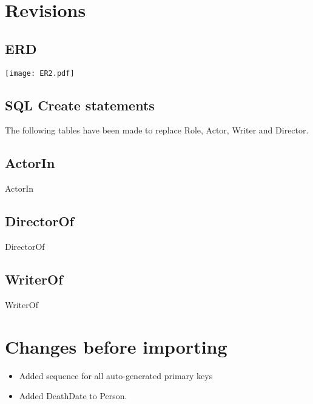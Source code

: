 \section{Revisions}

\subsection{ERD}
\texttt{[image: ER2.pdf]}

\subsection{SQL Create statements}
The following tables have been made to replace Role, Actor, Writer and Director.

\subsection*{ActorIn}
\begin{createSQL}{ActorIn}
\end{createSQL}

\subsection*{DirectorOf}
\begin{createSQL}{DirectorOf}
\end{createSQL}

\subsection*{WriterOf}
\begin{createSQL}{WriterOf}
\end{createSQL}

\section{Changes before importing}

\begin{itemize}
\item Added sequence for all auto-generated primary keys
\item Added DeathDate to Person.
\end{itemize}
